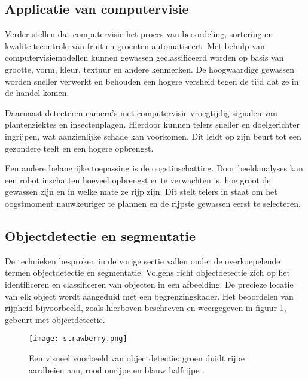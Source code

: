 \subsection{Applicatie van computervisie}
Verder stellen \textcite{Radojcic2023} dat computervisie het proces van beoordeling, sortering en kwaliteitscontrole van fruit en groenten automatiseert. Met behulp van computervisiemodellen kunnen gewassen geclassificeerd worden op basis van grootte, vorm, kleur, textuur en andere kenmerken. De hoogwaardige gewassen worden sneller verwerkt en behouden een hogere versheid tegen de tijd dat ze in de handel komen.

Daarnaast detecteren camera’s met computervisie vroegtijdig signalen van plantenziektes en insectenplagen. Hierdoor kunnen telers sneller en doelgerichter ingrijpen, wat aanzienlijke schade kan voorkomen. Dit leidt op zijn beurt tot een gezondere teelt en een hogere opbrengst.

Een andere belangrijke toepassing is de oogstinschatting. Door beeldanalyses kan een robot inschatten hoeveel opbrengst er te verwachten is, hoe groot de gewassen zijn en in welke mate ze rijp zijn. Dit stelt telers in staat om het oogstmoment nauwkeuriger te plannen en de rijpste gewassen eerst te selecteren.

\subsection{Objectdetectie en segmentatie}


De technieken besproken in de vorige sectie vallen onder de overkoepelende termen objectdetectie en segmentatie. Volgens \textcite{Sharma2020} richt objectdetectie zich op het identificeren en classificeren van objecten in een afbeelding. De precieze locatie van elk object wordt aangeduid met een begrenzingskader. Het beoordelen van rijpheid bijvoorbeeld, zoals hierboven beschreven en weergegeven in figuur \ref{fig:strawberry}, gebeurt met objectdetectie.

\begin{figure}
    \centering
    \texttt{[image: strawberry.png]}
    \caption[Voorbeeld objectdetectie.]{\label{fig:strawberry}Een visueel voorbeeld van objectdetectie: groen duidt rijpe aardbeien aan, rood onrijpe en blauw halfrijpe \autocite{Chai2023}.}
\end{figure}

